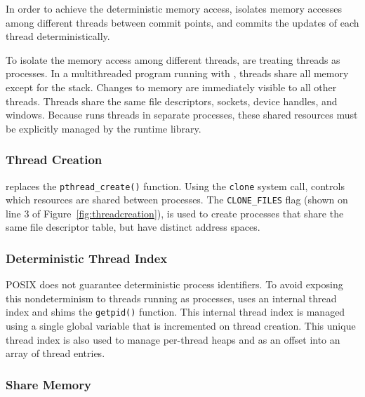 \label{sec:threadsasprocs}
In order to achieve the deterministic memory access, 
\dthreads{} isolates memory accesses among different
threads between commit points, and commits the updates of each thread deterministically.

To isolate the memory access among different threads, \dthreads{} are
treating threads as processes.  In a multithreaded program running
with \pthreads{}, threads share all memory except for the stack.  Changes
to memory are immediately visible to all other threads.  Threads share
the same file descriptors, sockets, device handles, and windows.
Because \dthreads{} runs threads in separate processes, these shared
resources must be explicitly managed by the runtime library.

\subsubsection{Thread Creation}
\dthreads{} replaces the \texttt{pthread\_create()} function.  Using the \texttt{clone} system call, \dthreads{} controls which resources are shared between processes.  The \texttt{CLONE\_FILES} flag (shown on line 3 of Figure~\ref{fig:threadcreation}), is used to create processes that share the same file descriptor table, but have distinct address spaces.

\subsubsection{Deterministic Thread Index}
\label{sec:threadindex}
POSIX does not guarantee deterministic process identifiers.  To avoid exposing this nondeterminism to threads running as processes, \dthreads{} uses an internal thread index and shims the \texttt{getpid()} function.  This internal thread index is managed using a single global variable that is incremented on thread creation.  This unique thread index is also used to manage per-thread heaps and as an offset into an array of thread entries.

\subsubsection{Share Memory}
\label{sec:stackandheap}

